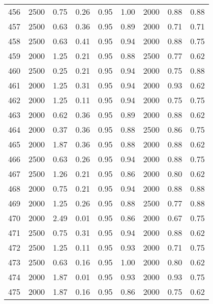 \begin{longtable}[c]{ccccccccc}
456 &  2500 &  0.75 &  0.26 &  0.95 &  1.00 &  2000 &  0.88 &  0.88 \\
457 &  2500 &  0.63 &  0.36 &  0.95 &  0.89 &  2000 &  0.71 &  0.71 \\
458 &  2500 &  0.63 &  0.41 &  0.95 &  0.94 &  2000 &  0.88 &  0.75 \\
459 &  2000 &  1.25 &  0.21 &  0.95 &  0.88 &  2500 &  0.77 &  0.62 \\
460 &  2500 &  0.25 &  0.21 &  0.95 &  0.94 &  2000 &  0.75 &  0.88 \\
461 &  2000 &  1.25 &  0.31 &  0.95 &  0.94 &  2000 &  0.93 &  0.62 \\
462 &  2000 &  1.25 &  0.11 &  0.95 &  0.94 &  2000 &  0.75 &  0.75 \\
463 &  2000 &  0.62 &  0.36 &  0.95 &  0.89 &  2000 &  0.88 &  0.62 \\
464 &  2000 &  0.37 &  0.36 &  0.95 &  0.88 &  2500 &  0.86 &  0.75 \\
465 &  2000 &  1.87 &  0.36 &  0.95 &  0.88 &  2000 &  0.88 &  0.62 \\
466 &  2500 &  0.63 &  0.26 &  0.95 &  0.94 &  2000 &  0.88 &  0.75 \\
467 &  2500 &  1.26 &  0.21 &  0.95 &  0.86 &  2000 &  0.80 &  0.62 \\
468 &  2000 &  0.75 &  0.21 &  0.95 &  0.94 &  2000 &  0.88 &  0.88 \\
469 &  2000 &  1.25 &  0.26 &  0.95 &  0.88 &  2500 &  0.77 &  0.88 \\
470 &  2000 &  2.49 &  0.01 &  0.95 &  0.86 &  2000 &  0.67 &  0.75 \\
471 &  2500 &  0.75 &  0.31 &  0.95 &  0.94 &  2000 &  0.88 &  0.62 \\
472 &  2500 &  1.25 &  0.11 &  0.95 &  0.93 &  2000 &  0.71 &  0.75 \\
473 &  2500 &  0.63 &  0.16 &  0.95 &  1.00 &  2000 &  0.80 &  0.62 \\
474 &  2000 &  1.87 &  0.01 &  0.95 &  0.93 &  2000 &  0.93 &  0.75 \\
475 &  2000 &  1.87 &  0.16 &  0.95 &  0.86 &  2000 &  0.75 &  0.62 \\
\bottomrule
\end{longtable}

